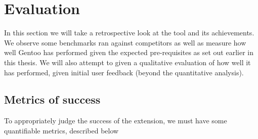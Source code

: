
\chapter{Evaluation}


In this section we will take a retrospective look at the tool and its achievements. We observe some benchmarks ran against competitors as well as measure how well Gentoo has performed given the expected pre-requisites as set out earlier in this thesis. We will also attempt to given a qualitative evaluation of how well it has performed, given initial user feedback (beyond the quantitative analysis).

\section{Metrics of success}

To appropriately judge the success of the extension, we must have some quantifiable metrics, described below

